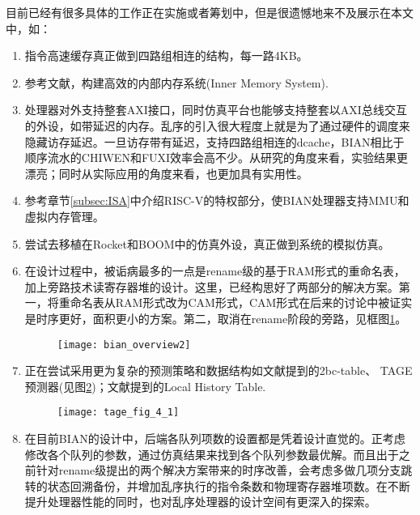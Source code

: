 目前已经有很多具体的工作正在实施或者筹划中，但是很遗憾地来不及展示在本文中，如：
\begin{enumerate}[label=(\arabic*)]
	\item 指令高速缓存真正做到四路组相连的结构，每一路4KB。
	\item 参考文献\citet{Alpha21264,MIPS1996}，构建高效的内部内存系统(Inner Memory System).
	\item 处理器对外支持整套AXI接口，同时仿真平台也能够支持整套以AXI总线交互的外设，如带延迟的内存。乱序的引入很大程度上就是为了通过硬件的调度来隐藏访存延迟。一旦访存带有延迟，支持四路组相连的dcache，BIAN相比于顺序流水的CHIWEN和FUXI效率会高不少。从研究的角度来看，实验结果更漂亮；同时从实际应用的角度来看，也更加具有实用性。
	\item 参考章节\ref{subsec:ISA}中介绍RISC-V的特权部分，使BIAN处理器支持MMU和虚拟内存管理。
	\item 尝试去移植在Rocket和BOOM中的仿真外设，真正做到系统的模拟仿真。
	\item 在设计过程中，被诟病最多的一点是rename级的基于RAM形式的重命名表，加上旁路技术读寄存器堆的设计。这里，已经构思好了两部分的解决方案。第一，将重命名表从RAM形式改为CAM形式，CAM形式在后来的讨论中被证实是时序更好，面积更小的方案。第二，取消在rename阶段的旁路，见框图\ref{fig:bian_over2}。
	\begin{figure}[!htbp]
		\centering
		\texttt{[image: bian\_overview2]}
		\label{fig:bian_over2}
	\end{figure}
	\item 正在尝试采用更为复杂的预测策略和数据结构如文献\citet{Celio:EECS-2018-151}提到的2bc-table、 TAGE预测器(见图\ref{fig:TAGE})；文献\citet{Alpha21264}提到的Local History Table.
	\begin{figure}[!htbp]
		\centering
		\texttt{[image: tage\_fig\_4\_1]}
		\label{fig:TAGE}
	\end{figure}
	\item 在目前BIAN的设计中，后端各队列项数的设置都是凭着设计直觉的。正考虑修改各个队列的参数，通过仿真结果来找到各个队列参数最优解。而且出于之前针对rename级提出的两个解决方案带来的时序改善，会考虑多做几项分支跳转的状态回溯备份，并增加乱序执行的指令条数和物理寄存器堆项数。在不断提升处理器性能的同时，也对乱序处理器的设计空间有更深入的探索。
\end{enumerate}
	
